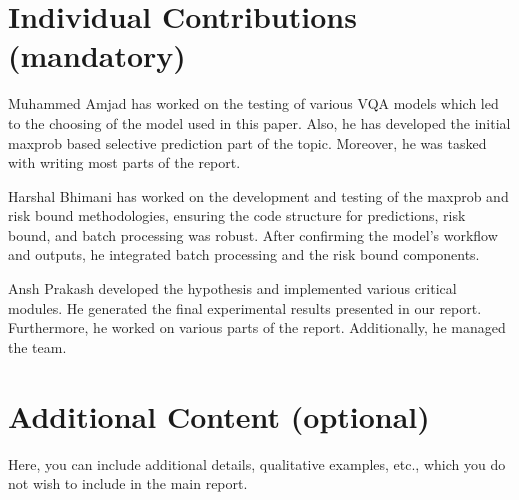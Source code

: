 \documentclass[
	english,
	accentcolor=8b,
	type=intern,
	marginpar=false
	]{tudapub}
\begin{document}
\section{Individual Contributions {\color{red}(mandatory)}}


Muhammed Amjad has worked on the testing of various VQA models which led to the choosing of the model used in this paper. Also, he has developed the initial maxprob based selective prediction part of the topic. Moreover, he was tasked with writing most parts of the report. \par
Harshal Bhimani has worked on the development and testing of the maxprob and risk bound methodologies, ensuring the code structure for predictions, risk bound, and batch processing was robust. After confirming the model's workflow and outputs, he integrated batch processing and the risk bound components. \par

Ansh Prakash developed the hypothesis and implemented various critical modules. He generated the final experimental results presented in our report. Furthermore, he worked on various parts of the report. Additionally, he managed the team.

\section{Additional Content (optional)}
Here, you can include additional details, qualitative examples, etc., which you do not wish to include in the main report.
\end{document}
